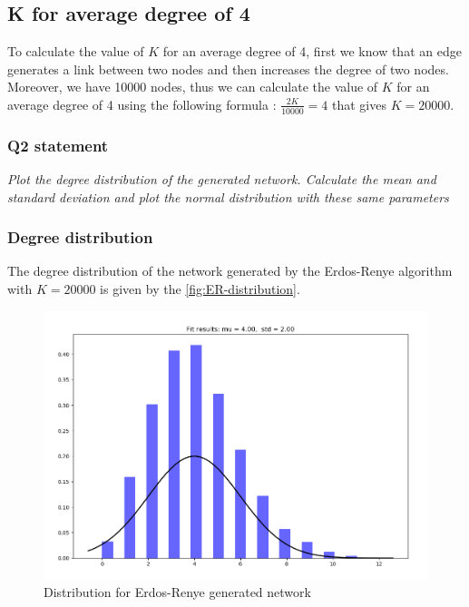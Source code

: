 \documentclass{article}
\begin{document}
\subsection*{K for average degree of 4}

To calculate the value of $K$ for an average degree of 4, first we know that an edge generates a link between two nodes and then increases the degree of two nodes. Moreover, we have 10000 nodes, thus we can calculate the value of $K$ for an average degree of 4 using the following formula : $ \frac{2K}{10000} = 4 $ that gives $K = 20000$. 

\subsubsection{Q2 statement}

\textit{Plot the degree distribution of the generated network. Calculate the mean and standard deviation and plot the normal distribution with these same parameters}

\subsubsection*{Degree distribution} 
The degree distribution of the network generated by the Erdos-Renye algorithm with $K = 20000$ is given by the \autoref{fig:ER-distribution}. 

\begin{figure}[h]
  \centering
  \includegraphics[scale=0.35]{fig/ER-distribution.png}
  \caption{Distribution for Erdos-Renye generated network}
  \label{fig:ER-distribution}
\end{figure}
\end{document}
